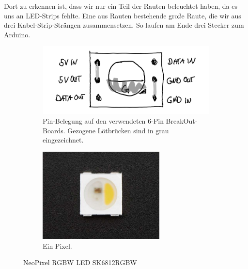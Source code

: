             Dort zu erkennen ist, dass wir nur ein Teil der Rauten beleuchtet haben, da es uns an LED-Strips fehlte. Eine aus Rauten bestehende große Raute, die wir aus drei Kabel-Strip-Strängen zusammensetzen.
            So laufen am Ende drei Stecker zum Arduino.\\

            \begin{figure}[H]
                \begin{subfigure}[b]{0.5\textwidth}
                    \centering\includegraphics[width=\textwidth]{media/03_technical_implementation/leds_2.png}
                    \caption{Pin-Belegung auf den verwendeten 6-Pin BreakOut-Boards. Gezogene Lötbrücken sind in grau eingezeichnet.}
                    \label{fig:pins_neopixel}
                \end{subfigure}\quad
                \begin{subfigure}[b]{0.5\textwidth}
                    \centering\includegraphics[width=0.7\textwidth]{media/03_technical_implementation/picture_neopixel.jpg}
                    \caption{Ein Pixel.}
                    \label{fig:picture_neopixel}
                \end{subfigure}
                \caption{NeoPixel RGBW LED SK6812RGBW}
            \end{figure}


